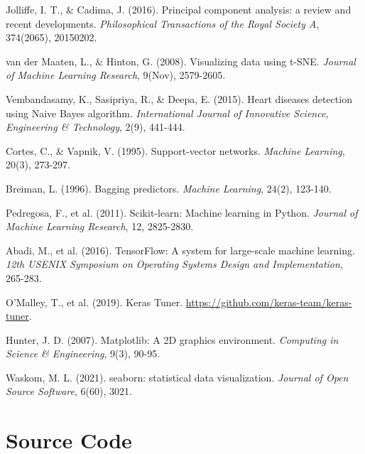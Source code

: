 \documentclass[12pt,a4paper]{article}
\begin{document}
\begin{enumerate}[label={[\arabic*]}]
    \item Jolliffe, I. T., \& Cadima, J. (2016). Principal component analysis: a review and recent developments. \textit{Philosophical Transactions of the Royal Society A}, 374(2065), 20150202.
    
    \item van der Maaten, L., \& Hinton, G. (2008). Visualizing data using t-SNE. \textit{Journal of Machine Learning Research}, 9(Nov), 2579-2605.
    
    \item Vembandasamy, K., Sasipriya, R., \& Deepa, E. (2015). Heart diseases detection using Naive Bayes algorithm. \textit{International Journal of Innovative Science, Engineering \& Technology}, 2(9), 441-444.
    
    \item Cortes, C., \& Vapnik, V. (1995). Support-vector networks. \textit{Machine Learning}, 20(3), 273-297.
    
    \item Breiman, L. (1996). Bagging predictors. \textit{Machine Learning}, 24(2), 123-140.
    
    \item Pedregosa, F., et al. (2011). Scikit-learn: Machine learning in Python. \textit{Journal of Machine Learning Research}, 12, 2825-2830.
    
    \item Abadi, M., et al. (2016). TensorFlow: A system for large-scale machine learning. \textit{12th USENIX Symposium on Operating Systems Design and Implementation}, 265-283.
    
    \item O'Malley, T., et al. (2019). Keras Tuner. \url{https://github.com/keras-team/keras-tuner}.
    
    \item Hunter, J. D. (2007). Matplotlib: A 2D graphics environment. \textit{Computing in Science \& Engineering}, 9(3), 90-95.
    
    \item Waskom, M. L. (2021). seaborn: statistical data visualization. \textit{Journal of Open Source Software}, 6(60), 3021.
\end{enumerate}

\newpage
\appendix
\section{Source Code}
\end{document}

